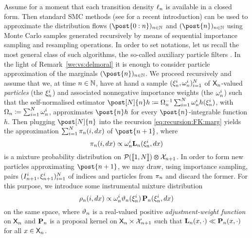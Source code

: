 Assume for a moment that each transition density $\ell_{n}$ is available in a closed form. Then standard SMC methods (see \cite{chopin:papaspiliopoulos:2020} for a recent introduction) can be used to approximate the distribution flows $(\post{0:n})_{n \in \nset}$ and $(\post{n})_{n \in \nset}$ using Monte Carlo samples generated recursively by means of sequential importance sampling and resampling operations. In order to set notations, let us recall the most general class of such algorithms, the so-called auxiliary particle filters \cite{pitt:shephard:1999}. In the light of Remark~\ref{we:vs:delmoral} it is enough to consider particle approximation of the marginals $(\post{n})_{n \in \nset}$. We proceed recursively and assume that we, at time $n \in \mathbb{N}$, have at hand a sample $(\xi_{n}^{i}, \omega_{n}^{i})_{i = 1}^N$ of $\mathsf{X}_n$-valued \emph{particles} (the $\xi_{n}^{i}$) and associated nonnegative importance weights (the $\omega_{n}^{i}$) such that the self-normalised estimator $\post[\N]{n} h \eqdef \sumwght{n}^{-1} \sum_{i = 1}^\N \ewght{n}{i} h(\epart{n}{i})$, with $\sumwght{n} \eqdef \sum_{i = 1}^\N \ewght{n}{i}$, approximates $\post{n} h$ for every $\post{n}$-integrable function $h$. Then plugging $\post[\N]{n}$ into the recursion \eqref{eq:recursion:FK:marg} yields the approximation $\sum_{i = 1}^N \pi_n(i, d x)$ of $\post{n + 1}$, where 
\begin{equation} \label{eq:def:partmixt}
\partmixt_n(i, \rmd x) \propto \ewght{n}{i} \uk{n}(\epart{n}{i}, \rmd x)
\end{equation}
is a mixture probability distribution on $\mathcal{P}(\llbracket 1, N \rrbracket) \varotimes \mathcal{X}_{n + 1}$. In order to form new particles approximating $\post{n + 1}$, we may draw, using importance sampling, pairs $(I_{n + 1}^{i}, \xi_{n + 1}^{i})_{i = 1}^N$ of indices and particles from $\pi_n$ and discard the former. For this purpose, we introduce some instrumental mixture distribution 
\begin{equation} \label{eq:cond:instrumental:mixture}
\rho_n(i, \rmd x) \propto \ewght{n}{i} \adjfuncforward{n}(\epart{n}{i}) \, \prop{n}(\epart{n}{i}, \rmd x)
\end{equation}
on the same space, where $\vartheta_{n}$ is a real-valued positive \emph{adjustment-weight function} on $\mathsf{X}_n$ and $\mathbf{P}_{n}$ is a proposal kernel on $\mathsf{X}_n \times \mathcal{X}_{n + 1}$ such that $\mathbf{L}_{n}(x, \cdot) \ll \mathbf{P}_{n}(x, \cdot)$ for all $x \in \mathsf{X}_n$. 

